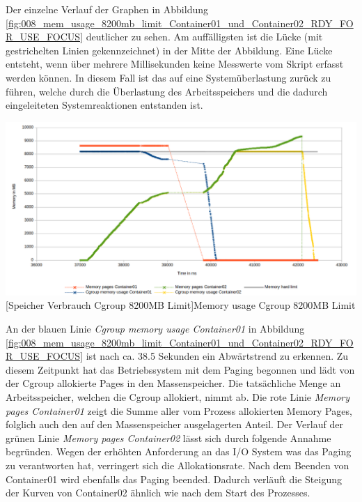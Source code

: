 Der einzelne Verlauf der Graphen in Abbildung \ref{fig:008_mem_usage_8200mb_limit_Container01_und_Container02_RDY_FOR_USE_FOCUS} deutlicher zu sehen. Am auffälligsten ist die Lücke (mit gestrichelten Linien gekennzeichnet) in der Mitte der Abbildung. Eine Lücke entsteht, wenn über mehrere Millisekunden keine Messwerte vom Skript erfasst werden können. In diesem Fall ist das auf eine Systemüberlastung zurück zu führen, welche durch die Überlastung des Arbeitsspeichers und die dadurch eingeleiteten Systemreaktionen entstanden ist. 

\vspace{1em}
\begin{minipage}{\linewidth}
	\centering
	\includegraphics[width=1\linewidth]{pics/008_mem_usage_8200mb_limit_Container01_und_Container02_RDY_FOR_USE_FOCUS.png}
	[Speicher Verbrauch Cgroup 8200MB Limit]{Memory usage Cgroup 8200MB Limit}
	\label{fig:008_mem_usage_8200mb_limit_Container01_und_Container02_RDY_FOR_USE_FOCUS}
\end{minipage}



An der blauen Linie \emph{Cgroup memory usage Container01} in Abbildung \ref{fig:008_mem_usage_8200mb_limit_Container01_und_Container02_RDY_FOR_USE_FOCUS} ist nach ca. 38.5 Sekunden ein Abwärtstrend zu erkennen. Zu diesem Zeitpunkt hat das Betriebssystem mit dem Paging begonnen und lädt von der Cgroup allokierte Pages in den Massenspeicher. Die tatsächliche Menge an Arbeitsspeicher, welchen die Cgroup allokiert, nimmt ab. Die rote Linie \emph{Memory pages Container01} zeigt die Summe aller vom Prozess allokierten Memory Pages, folglich auch den auf den Massenspeicher ausgelagerten Anteil. Der Verlauf der grünen Linie \emph{Memory pages Container02} lässt sich durch folgende Annahme begründen. Wegen der erhöhten Anforderung an das I/O System was das Paging zu verantworten hat, verringert sich die Allokationsrate. Nach dem Beenden von Container01 wird ebenfalls das Paging beended. Dadurch verläuft die Steigung der Kurven von Container02 ähnlich wie nach dem Start des Prozesses. 

